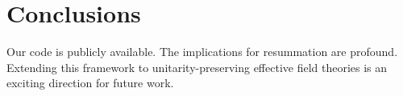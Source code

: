 \section{Conclusions}\label{sec:conclusions}

Our code is publicly available. The implications for resummation are
profound. Extending this framework to unitarity-preserving effective
field theories is an exciting direction for future work.


